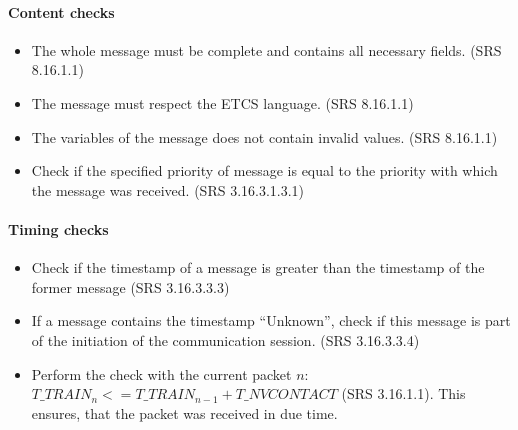 \documentclass{template/openetcs_report}
\begin{document}
\paragraph{Content checks}
\begin{itemize}
 \item The whole message must be complete and contains all necessary fields. (SRS 8.16.1.1)
 \item The message must respect the ETCS language. (SRS 8.16.1.1)
 \item The variables of the message does not contain invalid values. (SRS 8.16.1.1) %
 \item Check if the specified priority of message is equal to the priority with which the message was received. (SRS 3.16.3.1.3.1) 
\end{itemize}


\paragraph{Timing checks}
\begin{itemize}
 \item Check if the timestamp of a message is greater than the timestamp of the former message (SRS 3.16.3.3.3)
 \item If a message contains the timestamp ``Unknown'', check if this message is part of the initiation of the communication session. (SRS 3.16.3.3.4)
 \item Perform the check with the current packet $n$:  $T\_TRAIN_{n} <= T\_TRAIN_{n-1} + T\_NVCONTACT$ (SRS 3.16.1.1). This ensures, that the packet was received in due time.
\end{itemize}

\end{document}
